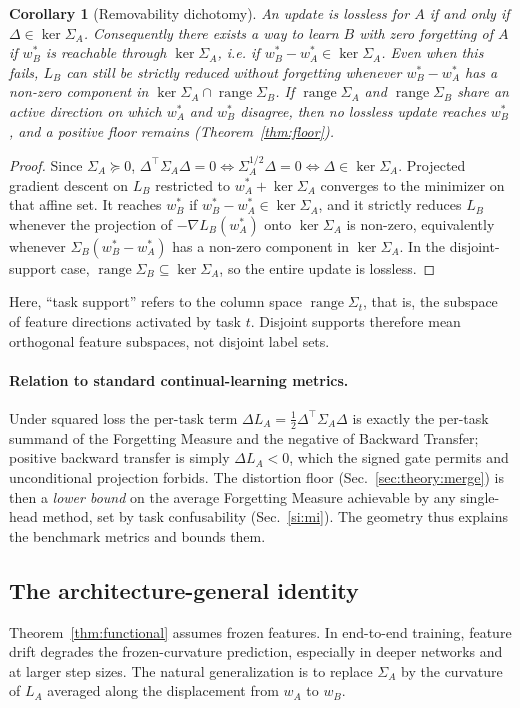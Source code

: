 \documentclass[10pt,a4paper]{article}
\theoremstyle{plain}
\newtheorem{corollary}{Corollary}
\theoremstyle{definition}
\newcommand{\Sig}{\Sigma}
\newcommand{\Del}{\Delta}
\DeclareMathOperator{\range}{range}
\begin{document}
\begin{corollary}[Removability dichotomy]
\label{cor:removability}
An update is lossless for $A$ if and only if $\Del\in\ker\Sig_A$. Consequently there
exists a way to learn $B$ with zero forgetting of $A$ if $w_B^\ast$ is reachable
through $\ker\Sig_A$, i.e. if $w_B^\ast-w_A^\ast\in\ker\Sig_A$. Even when this fails,
$L_B$ can still be strictly reduced without forgetting whenever $w_B^\ast-w_A^\ast$ has
a non-zero component in $\ker\Sig_A\cap\range\Sig_B$. If $\range\Sig_A$ and
$\range\Sig_B$ share an active direction on which $w_A^\ast$ and $w_B^\ast$ disagree,
then no lossless update reaches $w_B^\ast$, and a positive floor remains
(Theorem~\ref{thm:floor}).
\end{corollary}
\begin{proof}
Since $\Sig_A\succeq0$, $\Del^\top\Sig_A\Del=0\Leftrightarrow\Sig_A^{1/2}\Del=0
\Leftrightarrow\Del\in\ker\Sig_A$. Projected gradient descent on $L_B$ restricted to
$w_A^\ast+\ker\Sig_A$ converges to the minimizer on that affine set. It reaches
$w_B^\ast$ if $w_B^\ast-w_A^\ast\in\ker\Sig_A$, and it strictly reduces $L_B$ whenever
the projection of $-\nabla L_B(w_A^\ast)$ onto $\ker\Sig_A$ is non-zero, equivalently
whenever $\Sig_B(w_B^\ast-w_A^\ast)$ has a non-zero component in $\ker\Sig_A$. In the
disjoint-support case, $\range\Sig_B\subseteq\ker\Sig_A$, so the entire update is
lossless.
\end{proof}

Here, ``task support'' refers to the column space $\range\Sig_t$, that is, the
subspace of feature directions activated by task $t$. Disjoint supports therefore mean
orthogonal feature subspaces, not disjoint label sets.

\paragraph{Relation to standard continual-learning metrics.} Under squared
loss the per-task term $\Del L_A=\tfrac12\Del^\top\Sig_A\Del$ is exactly the per-task
summand of the Forgetting Measure and the negative of Backward Transfer; positive
backward transfer is simply $\Del L_A<0$, which the signed gate permits and unconditional
projection forbids. The distortion floor (Sec.~\ref{sec:theory:merge}) is then a
\emph{lower bound} on the average Forgetting Measure achievable by any single-head
method, set by task confusability (Sec.~\ref{si:mi}). The geometry thus explains the
benchmark metrics and bounds them.

\subsection{The architecture-general identity}
\label{sec:theory:general}
Theorem~\ref{thm:functional} assumes frozen features. In end-to-end training, feature
drift degrades the frozen-curvature prediction, especially in deeper networks and at
larger step sizes. The natural generalization is to replace $\Sig_A$ by the curvature
of $L_A$ averaged along the displacement from $w_A$ to $w_B$.
\end{document}
